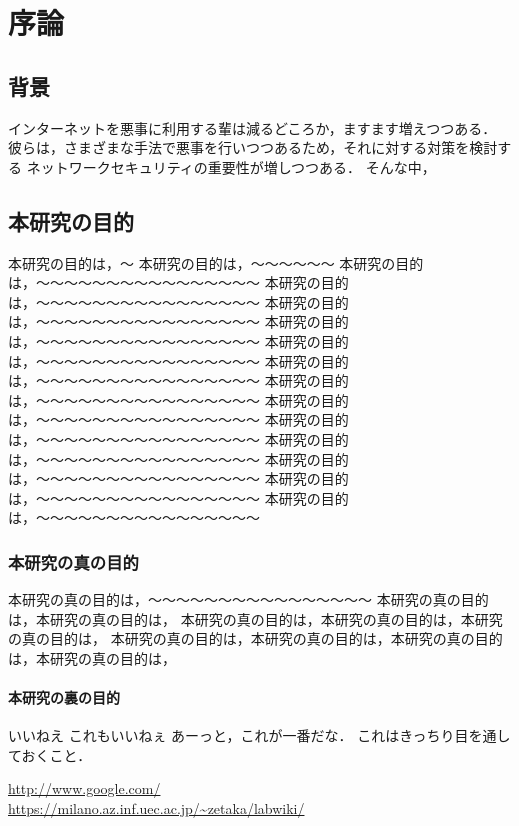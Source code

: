 \chapter{序論}\label{chap:introduction}

\section{背景}
インターネットを悪事に利用する輩は減るどころか，ますます増えつつある．
彼らは，さまざまな手法で悪事を行いつつあるため，それに対する対策を検討する
ネットワークセキュリティの重要性が増しつつある\cite{ipsj-thesisformat}．
そんな中，

\section{本研究の目的}

本研究の目的は，〜
本研究の目的は，〜〜〜〜〜〜
本研究の目的は，〜〜〜〜〜〜〜〜〜〜〜〜〜〜〜〜
本研究の目的は，〜〜〜〜〜〜〜〜〜〜〜〜〜〜〜〜
本研究の目的は，〜〜〜〜〜〜〜〜〜〜〜〜〜〜〜〜
本研究の目的は，〜〜〜〜〜〜〜〜〜〜〜〜〜〜〜〜
本研究の目的は，〜〜〜〜〜〜〜〜〜〜〜〜〜〜〜〜
本研究の目的は，〜〜〜〜〜〜〜〜〜〜〜〜〜〜〜〜
本研究の目的は，〜〜〜〜〜〜〜〜〜〜〜〜〜〜〜〜
本研究の目的は，〜〜〜〜〜〜〜〜〜〜〜〜〜〜〜〜
本研究の目的は，〜〜〜〜〜〜〜〜〜〜〜〜〜〜〜〜
本研究の目的は，〜〜〜〜〜〜〜〜〜〜〜〜〜〜〜〜
本研究の目的は，〜〜〜〜〜〜〜〜〜〜〜〜〜〜〜〜
本研究の目的は，〜〜〜〜〜〜〜〜〜〜〜〜〜〜〜〜
本研究の目的は，〜〜〜〜〜〜〜〜〜〜〜〜〜〜〜〜

\subsection{本研究の真の目的}
\label{subsec:ura}

本研究の真の目的は，〜〜〜〜〜〜〜〜〜〜〜〜〜〜〜〜
本研究の真の目的は，本研究の真の目的は，
本研究の真の目的は，本研究の真の目的は，本研究の真の目的は，
本研究の真の目的は，本研究の真の目的は，本研究の真の目的は，本研究の真の目的は，

\subsubsection{本研究の裏の目的}

いいねえ\cite{Findlater:2011}
これもいいねぇ\cite{motomura:2000-11-15}
あーっと，これが一番だな\cite{ipsj-thesisformat}．
これはきっちり目を通しておくこと．

\url{http://www.google.com/} \\
\url{https://milano.az.inf.uec.ac.jp/~zetaka/labwiki/}

